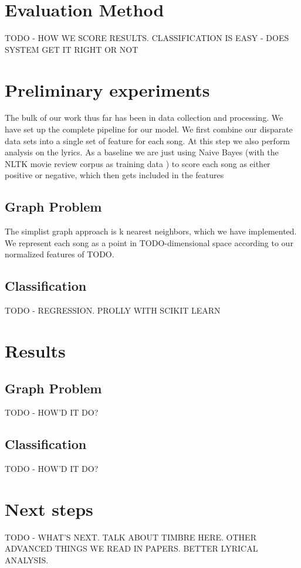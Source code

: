 \documentclass[10pt,journal,compsoc]{IEEEtran}
\begin{document}
\section{Evaluation Method}
TODO - HOW WE SCORE RESULTS. CLASSIFICATION IS EASY - DOES SYSTEM GET IT RIGHT OR NOT

\section{Preliminary experiments}
The bulk of our work thus far has been in data collection and processing. We have set up the complete pipeline for our model. We first combine our disparate data sets into a single set of feature for each song. At this step we also perform analysis on the lyrics. As a baseline we are just using Naive Bayes (with the NLTK movie review corpus as training data \cite{nltk}) to score each song as either positive or negative, which then gets included in the features

\subsection{Graph Problem}
The simplist graph approach is k nearest neighbors, which we have implemented. We represent each song as a point in TODO-dimensional space according to our normalized features of TODO.

\subsection{Classification}
TODO - REGRESSION. PROLLY WITH SCIKIT LEARN

\section{Results}

\subsection{Graph Problem}
TODO - HOW'D IT DO?

\subsection{Classification}
TODO - HOW'D IT DO?

\section{Next steps}
TODO - WHAT'S NEXT. TALK ABOUT TIMBRE HERE. OTHER ADVANCED THINGS WE READ IN PAPERS. BETTER LYRICAL ANALYSIS.
\end{document}
